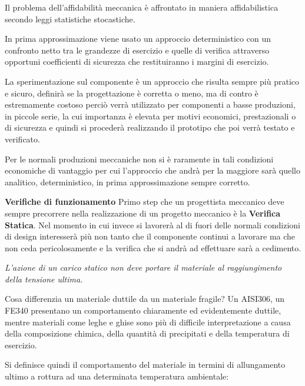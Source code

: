 \documentclass{article}
\begin{document}
\begin{adjustwidth}{2in}{}
		Il problema dell'affidabilità meccanica è affrontato in maniera affidabilistica secondo leggi statistiche stocastiche. 
		
		In prima approssimazione viene usato un approccio deterministico con un confronto netto tra le grandezze di esercizio e quelle di verifica attraverso opportuni coefficienti di sicurezza che restituiranno i margini di esercizio. 
		
		La sperimentazione sul componente è un approccio che risulta sempre più pratico e sicuro, definirà se la progettazione è corretta o meno, ma di contro è estremamente costoso perciò verrà utilizzato per componenti a basse produzioni, in piccole serie, la cui importanza è elevata per motivi economici, prestazionali o di sicurezza e quindi si procederà realizzando il prototipo che poi verrà testato e verificato. 
		
		Per le normali produzioni meccaniche non si è raramente in tali condizioni economiche di vantaggio per cui l'approccio che andrà per la maggiore sarà quello analitico, deterministico, in prima approssimazione sempre corretto. \newpage 
		
		\textbf{{\Large Verifiche di funzionamento}}\newline 
		Primo step che un progettista meccanico deve sempre precorrere nella realizzazione di un progetto meccanico è la \textbf{Verifica Statica}. Nel momento in cui invece si lavorerà al di fuori delle normali condizioni di design interesserà più non tanto che il componente continui a lavorare ma che non ceda pericolosamente e la verifica che si andrà ad effettuare sarà a cedimento. \newline 
		
		\begin{center}
		\textit{	L'azione di un carico statico non deve portare il materiale al raggiungimento della tensione ultima.} \newline
		\end{center}
	
		Cosa differenzia un materiale duttile da un materiale fragile? Un AISI306, un FE340 presentano un comportamento chiaramente ed evidentemente duttile, mentre materiali come leghe e ghise sono più di difficile interpretazione a causa della composizione chimica, della quantità di precipitati e della temperatura di esercizio.
		
		 Si definisce quindi il comportamento del materiale in termini di allungamento ultimo a rottura ad una determinata temperatura ambientale: 
		 

\end{adjustwidth}
\end{document}
